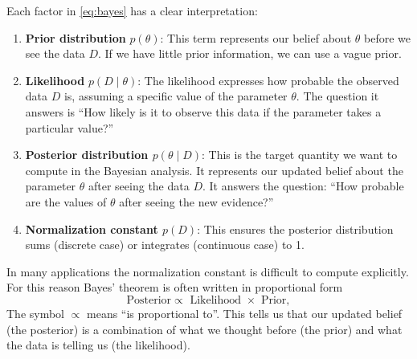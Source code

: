 Each factor in \eqref{eq:bayes} has a clear interpretation:
\begin{enumerate}
    \item \textbf{Prior distribution} $p(\theta)$: This term represents our belief about $\theta$ before we see the data $D$. If we have little prior information, we can use a vague prior.
    \item \textbf{Likelihood} $p(D \mid \theta)$: The likelihood expresses how probable the observed data $D$ is, assuming a specific value of the parameter $\theta$. The question it answers is ``How likely is it to observe this data if the parameter takes a particular value?''
    \item \textbf{Posterior distribution $p(\theta \mid D)$}: This is the target quantity we want to compute in the Bayesian analysis. It represents our updated belief about the parameter $\theta$ after seeing the data $D$. It answers the question: ``How probable are the values of $\theta$ after seeing the new evidence?''
    \item \textbf{Normalization constant $p(D)$}: This ensures the posterior distribution sums (discrete case) or integrates (continuous case) to 1.  
\end{enumerate}

In many applications the normalization constant is difficult to compute explicitly. For this reason Bayes' theorem is often written in proportional form
\[
\text{Posterior} \propto \text{ Likelihood } \times \text{ Prior},
\]
The symbol $\propto$ means ``is proportional to''. This tells us that our updated belief (the posterior) is a combination of what we thought before (the prior) and what the data is telling us (the likelihood).


